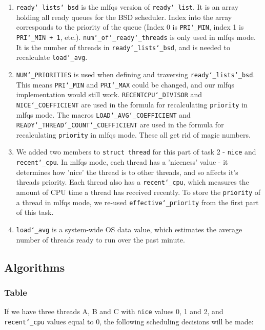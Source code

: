\documentclass{article}
\renewcommand{\_}{\char`_}
\begin{document}
\begin{enumerate}

\item \texttt{ready\_lists\_bsd} is the mlfqs version of \texttt{ready\_list}. It is an array holding all ready queues for the BSD scheduler. Index into the array corresponds to the priority of the queue (Index 0 is \texttt{PRI\_MIN}, index 1 is \texttt{PRI\_MIN + 1}, etc.). \texttt{num\_of\_ready\_threads} is only used in mlfqs mode. It is the number of threads in \texttt{ready\_lists\_bsd}, and is needed to recalculate \texttt{load\_avg}.

\item \texttt{NUM\_PRIORITIES} is used when defining and traversing \texttt{ready\_lists\_bsd}. This means \texttt{PRI\_MIN} and \texttt{PRI\_MAX} could be changed, and our mlfqs implementation would still work. \texttt{RECENTCPU\_DIVISOR} and \texttt{NICE\_COEFFICIENT} are used in the formula for recalculating \texttt{priority} in mlfqs mode. The macros \texttt{LOAD\_AVG\_COEFFICIENT} and \texttt{READY\_THREAD\_COUNT\_COEFFICIENT} are used in the formula for recalculating \texttt{priority} in mlfqs mode. These all get rid of magic numbers.

\item We added two members to \texttt{struct thread} for this part of task 2 - \texttt{nice} and \texttt{recent\_cpu}. In mlfqs mode, each thread has a 'niceness' value - it determines how 'nice' the thread is to other threads, and so affects it's threads priority. Each thread also has a \texttt{recent\_cpu}, which measures the amount of CPU time a thread has received recently. To store the \texttt{priority} of a thread in mlfqs mode, we re-used \texttt{effective\_priority} from the first part of this task.

\item \texttt{load\_avg} is a system-wide OS data value, which estimates the average number of threads ready to run over the past minute.

\end{enumerate}

\subsection{Algorithms}
\subsubsection{Table}

If we have three threads A, B and C with \texttt{nice} values 0, 1 and 2, and \texttt{recent\_cpu} values equal to 0, the following scheduling decisions will be made:
\end{document}
